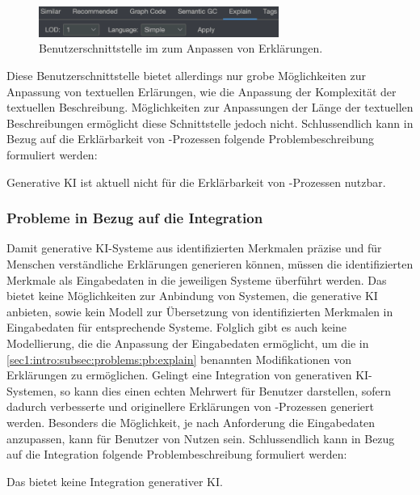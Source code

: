 \begin{figure}[htb]
    \centering
    \includegraphics[width=0.7\textwidth]{resources/images/explain-ui.png}
    \caption{Benutzerschnittstelle im \gmaf{} zum Anpassen von Erklärungen.}
    \label{sec1:intro:subsec:problems:fig:explain-ui}
\end{figure}
Diese Benutzerschnittstelle bietet allerdings nur grobe Möglichkeiten zur Anpassung von textuellen Erlärungen, wie die Anpassung der Komplexität der textuellen Beschreibung.
Möglichkeiten zur Anpassungen der Länge der textuellen Beschreibungen ermöglicht diese Schnittstelle jedoch nicht. Schlussendlich kann in Bezug auf die Erklärbarkeit von \mmir{}-Prozessen folgende Problembeschreibung formuliert werden:

\problemstmt{} Generative KI ist aktuell nicht für die Erklärbarkeit von \mmir{}-Prozessen nutzbar.

\subsubsection{Probleme in Bezug auf die Integration}
\label{sec1:intro:subsec:problems:pb:integration}
Damit generative KI-Systeme aus identifizierten Merkmalen präzise und für Menschen verständliche Erklärungen generieren können, müssen die identifizierten Merkmale als Eingabedaten in die jeweiligen Systeme überführt werden.
Das \gmaf{} bietet keine Möglichkeiten zur Anbindung von Systemen, die generative KI anbieten, sowie kein Modell zur Übersetzung von identifizierten Merkmalen in Eingabedaten für entsprechende Systeme.
Folglich gibt es auch keine Modellierung, die die Anpassung der Eingabedaten ermöglicht, um die in \cref{sec1:intro:subsec:problems:pb:explain} benannten Modifikationen von Erklärungen zu ermöglichen.
Gelingt eine Integration von generativen KI-Systemen, so kann dies einen echten Mehrwert für Benutzer darstellen, sofern dadurch verbesserte und originellere Erklärungen von \mmir{}-Prozessen generiert werden.
Besonders die Möglichkeit, je nach Anforderung die Eingabedaten anzupassen, kann für Benutzer von Nutzen sein.
Schlussendlich kann in Bezug auf die Integration folgende Problembeschreibung formuliert werden:

\problemstmt{} Das \gmaf{} bietet keine Integration generativer KI.

